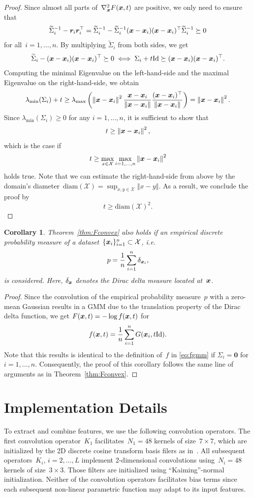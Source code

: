 \documentclass{article}
\newcommand{\X}{\mathcal{X}}
\newcommand{\id}{\mathrm{Id}}
\newcommand{\norm}[1]{\left\Vert#1\right\Vert}
\newcommand{\diameter}{\mathrm{diam}}
\theoremstyle{plain}
\newtheorem{corollary}[theorem]{Corollary}
\theoremstyle{definition}
\theoremstyle{remark}
\begin{document}
\begin{proof}
Since almost all parts of~$\nabla_{\bm{x}}^2 F({\bm{x}}, t)$ are positive, we only need to ensure that
\[
\widetilde{\Sigma}_i^{-1} - {\bm{r}}_i{\bm{r}}_i^\top = \widetilde{\Sigma}_i^{-1} - \widetilde{\Sigma}_i^{-1} ({\bm{x}}-{\bm{x}}_i)({\bm{x}}-{\bm{x}}_i)^\top \widetilde{\Sigma}_i^{-1} \succeq 0
\]
for all~$i=1,\ldots,n$.
By multiplying $\widetilde{\Sigma}_i$ from both sides, we get
\[
\widetilde{\Sigma}_i - (\vx-\vx_i)(\vx-\vx_i)^\top \succeq 0 \iff \Sigma_i + t\id \succeq (\vx-\vx_i)(\vx-\vx_i)^\top.
\]
Computing the minimal Eigenvalue on the left-hand-side and the maximal Eigenvalue on the right-hand-side, we obtain
\[
\lambda_\mathrm{min}(\Sigma_i) + t \geq \lambda_\mathrm{max}\left(\norm{\vx-\vx_i}^2 \frac{\vx-\vx_i}{\norm{\vx-\vx_i}}\frac{(\vx-\vx_i)^\top}{\norm{\vx-\vx_i}}\right) = \norm{\vx-\vx_i}^2.
\]
Since $\lambda_\mathrm{min}(\Sigma_i)\geq0$ for any $i=1,\ldots,n$, it is sufficient to show that
\[
t\geq \norm{\vx-\vx_i}^2,
\]
which is the case if 
\[
t\geq \max_{x\in\X}\max_{i=1,\ldots,n} \norm{\vx-\vx_i}^2
\]
holds true.
Note that we can estimate the right-hand-side from above by the domain's diameter~$\diameter(\X)=\sup_{x,y\in\X}\norm{x-y}$.
As a result, we conclude the proof by
\[
t\geq \diameter(\X)^2.
\]
\end{proof}

\begin{corollary}
Theorem~\ref{thm:Fconvex} also holds if an empirical discrete probability measure of a dataset~$\{\vx_i\}_{i=1}^n\subset\X$, i.e.
\[
p = \frac{1}{n}\sum_{i=1}^n\delta_{{\bm{x}}_i},
\]
is considered.
Here, $\delta_{{\bm{x}}}$ denotes the Dirac delta measure located at~${\bm{x}}$.
\end{corollary}

\begin{proof}
Since the convolution of the empirical probability measure~$p$ with a zero-mean Gaussian results in a GMM due to the translation property of the Dirac delta function, we get $F({\bm{x}},t) = -\log f({\bm{x}},t)$ for
\[
f(\vx,t)=\frac{1}{n}\sum_{i=1}^n G(\vx_i, t\id).
\]
Note that this results is identical to the definition of~$f$ in \eqref{eq:fgmm} if $\Sigma_i=\bm{0}$ for $i=1,\ldots,n$.
Consequently, the proof of this corollary follows the same line of arguments as in Theorem~\ref{thm:Fconvex}.
\end{proof}

\section{Implementation Details} \label{apdx:implementationDetails}
To extract and combine features, we use the following convolution operators.
The first convolution operator~$K_1$ facilitates~$N_1=48$ kernels of size~$7\times 7$, which are initialized by the 2D discrete cosine transform basis filers as in~\citet{ChPo16,KoKl17}.
All subsequent operators~$K_i$, $i=2,\ldots,L$ implement 2-dimensional convolutions using~$N_i=48$ kernels of size~$3\times 3$.
Those filters are initialized using ``Kaiming''-normal initialization.
Neither of the convolution operators facilitates bias terms since each subsequent non-linear parametric function may adapt to its input features.
\end{document}
